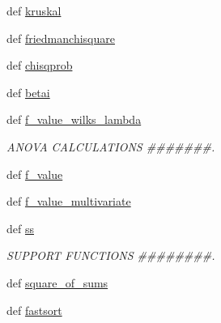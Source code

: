 \begin{DoxyCompactItemize}
\item 
def \hyperlink{namespacescipy_1_1stats_1_1stats_a4e2fff18e299993bcc12e0e3c5de4f7e}{kruskal}
\item 
def \hyperlink{namespacescipy_1_1stats_1_1stats_a1bd75857c9de144bfaddff735251937d}{friedmanchisquare}
\item 
def \hyperlink{namespacescipy_1_1stats_1_1stats_aae24e21814c47295188da5e409fbf5d3}{chisqprob}
\item 
def \hyperlink{namespacescipy_1_1stats_1_1stats_a3e7685fba302d7d422c51406425ca9fa}{betai}
\item 
def \hyperlink{namespacescipy_1_1stats_1_1stats_a44e70e3ef03804f5c935efe5dc2f319b}{f\+\_\+value\+\_\+wilks\+\_\+lambda}
\begin{DoxyCompactList}\small\item\em A\+N\+O\+V\+A C\+A\+L\+C\+U\+L\+A\+T\+I\+O\+N\+S \#\#\#\#\#\#\#. \end{DoxyCompactList}\item 
def \hyperlink{namespacescipy_1_1stats_1_1stats_a3d5ee5a28595171b4204a98c3961f7ce}{f\+\_\+value}
\item 
def \hyperlink{namespacescipy_1_1stats_1_1stats_a4795beed156e1591a1bffa0e013b1c11}{f\+\_\+value\+\_\+multivariate}
\item 
def \hyperlink{namespacescipy_1_1stats_1_1stats_a73704e49e0db2b3a28f07bc36086f4dc}{ss}
\begin{DoxyCompactList}\small\item\em S\+U\+P\+P\+O\+R\+T F\+U\+N\+C\+T\+I\+O\+N\+S \#\#\#\#\#\#\#\#. \end{DoxyCompactList}\item 
def \hyperlink{namespacescipy_1_1stats_1_1stats_a1680aa2ef3675bd4e3b47c7ee0ae6b6b}{square\+\_\+of\+\_\+sums}
\item 
def \hyperlink{namespacescipy_1_1stats_1_1stats_a9c9a228e8fa482503318a37074f3ee2e}{fastsort}
\end{DoxyCompactItemize}

